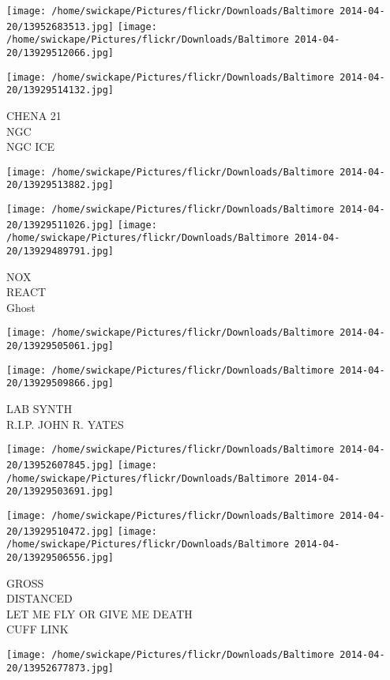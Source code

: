 \documentclass[10pt,letterpaper]{article}
\begin{document}
\texttt{[image: /home/swickape/Pictures/flickr/Downloads/Baltimore 2014-04-20/13952683513.jpg]}
\texttt{[image: /home/swickape/Pictures/flickr/Downloads/Baltimore 2014-04-20/13929512066.jpg]}

\vspace{0.25in}
\texttt{[image: /home/swickape/Pictures/flickr/Downloads/Baltimore 2014-04-20/13929514132.jpg]}

CHENA 21\\
NGC\\
NGC ICE
\pagebreak

\texttt{[image: /home/swickape/Pictures/flickr/Downloads/Baltimore 2014-04-20/13929513882.jpg]}

\vspace{0.25in}
\texttt{[image: /home/swickape/Pictures/flickr/Downloads/Baltimore 2014-04-20/13929511026.jpg]}
\texttt{[image: /home/swickape/Pictures/flickr/Downloads/Baltimore 2014-04-20/13929489791.jpg]}

NOX\\
REACT\\
Ghost
\pagebreak

\texttt{[image: /home/swickape/Pictures/flickr/Downloads/Baltimore 2014-04-20/13929505061.jpg]}

\vspace{0.25in}
\texttt{[image: /home/swickape/Pictures/flickr/Downloads/Baltimore 2014-04-20/13929509866.jpg]}

LAB SYNTH\\
R.I.P. JOHN R. YATES
\pagebreak

\texttt{[image: /home/swickape/Pictures/flickr/Downloads/Baltimore 2014-04-20/13952607845.jpg]}
\texttt{[image: /home/swickape/Pictures/flickr/Downloads/Baltimore 2014-04-20/13929503691.jpg]}

\texttt{[image: /home/swickape/Pictures/flickr/Downloads/Baltimore 2014-04-20/13929510472.jpg]}
\texttt{[image: /home/swickape/Pictures/flickr/Downloads/Baltimore 2014-04-20/13929506556.jpg]}

GROSS\\
DISTANCED\\
LET ME FLY OR GIVE ME DEATH\\
CUFF LINK
\pagebreak

\texttt{[image: /home/swickape/Pictures/flickr/Downloads/Baltimore 2014-04-20/13952677873.jpg]}
\end{document}
